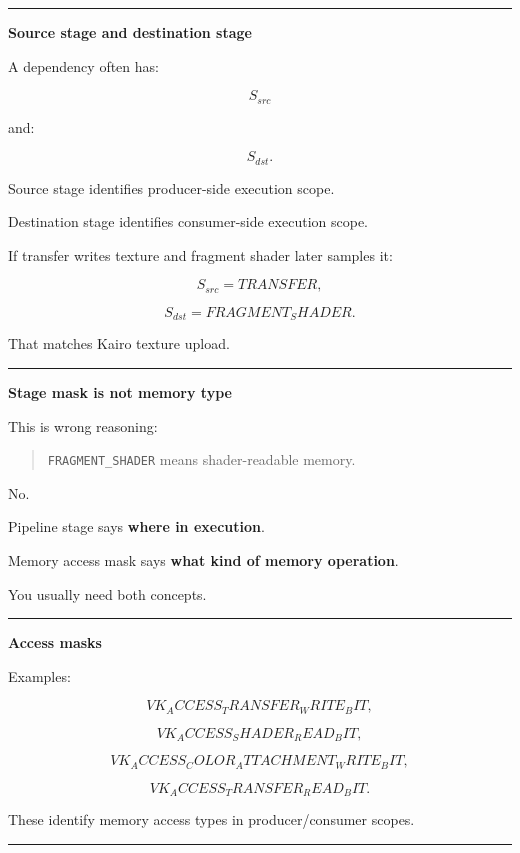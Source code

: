 \begin{center}\rule{0.5\linewidth}{0.5pt}\end{center}

\textbf{Source stage and destination stage}

A dependency often has:

\[
S_{src}
\]

and:

\[
S_{dst}.
\]

Source stage identifies producer-side execution scope.

Destination stage identifies consumer-side execution scope.

If transfer writes texture and fragment shader later samples it:

\[
S_{src}
=
TRANSFER,
\]

\[
S_{dst}
=
FRAGMENT_SHADER.
\]

That matches Kairo texture upload.

\begin{center}\rule{0.5\linewidth}{0.5pt}\end{center}

\textbf{Stage mask is not memory type}

This is wrong reasoning:

\begin{quote}
\texttt{FRAGMENT\_SHADER} means shader-readable memory.
\end{quote}

No.

Pipeline stage says \textbf{where in execution}.

Memory access mask says \textbf{what kind of memory operation}.

You usually need both concepts.

\begin{center}\rule{0.5\linewidth}{0.5pt}\end{center}

\textbf{Access masks}

Examples:

\[
VK_ACCESS_TRANSFER_WRITE_BIT,
\]

\[
VK_ACCESS_SHADER_READ_BIT,
\]

\[
VK_ACCESS_COLOR_ATTACHMENT_WRITE_BIT,
\]

\[
VK_ACCESS_TRANSFER_READ_BIT.
\]

These identify memory access types in producer/consumer scopes.

\begin{center}\rule{0.5\linewidth}{0.5pt}\end{center}

